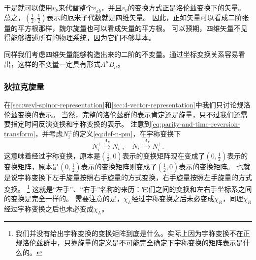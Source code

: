 于是就可以使用$v_\nu$来代替整个$v_{a\dot{b}}$，并且$v_\nu$的变换方式正是洛伦兹变换下的矢量。
总之，$(\frac{1}{2}, \frac{1}{2})$表示的厄米子代数就是四维矢量。
因此，正如矢量可以看成二阶张量的平方根那样，魏尔旋量也可以看成矢量的平方根。
可以预期，四维矢量不见得能够描述所有的物理系统，因为它们不够基本。

同样我们考虑四维矢量能够构造出来的二阶的不变量。通过坐标变换关系容易看出，这样的不变量一定具有形式$A^\mu B_\mu$。

\subsubsection{狄拉克旋量}

在\autoref{sec:weyl-spinor-representation}和\autoref{sec:4-vector-representation}中我们只讨论规洛伦兹变换的表示。
当然，完整的洛伦兹群的表示肯定还是旋量，只不过我们还需要指定时间反演变换和宇称变换的表示。
注意到\eqref{eq:parity-and-time-reversion-transform}，并考虑$N_i^\pm$的定义\eqref{eq:def-n-pm}，在宇称变换下
\begin{equation}
    N_i^+ \stackrel{\Lambda_P}{\longrightarrow} N_i^-, \quad N_i^- \stackrel{\Lambda_P}{\longrightarrow} N_i^+.
\end{equation}
这意味着经过宇称变换，原本是$(\frac{1}{2}, 0)$表示的变换矩阵现在变成了$(0, \frac{1}{2})$表示的变换矩阵，原本是$(0, \frac{1}{2})$表示的变换矩阵则变成了$(\frac{1}{2}, 0)$表示的变换矩阵。
也就是说宇称变换下左手旋量按照右手旋量的方式变换，右手旋量按照左手旋量的方式变换。%
\footnote{我们并没有给出宇称变换的变换矩阵到底是什么。实际上因为宇称变换不在正规洛伦兹群中，只靠旋量的定义是不可能完全确定下宇称变换的矩阵表示是什么的。}%
这就是“左手”、“右手”名称的来历：它们之间的变换和左右手坐标系之间的变换是完全一样的。
需要注意的是，$\chi_L$经过宇称变换之后未必变成$\chi_R$，同理$\chi_R$经过宇称变换之后也未必变成$\chi_L$。

